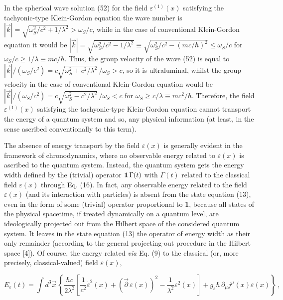 \documentclass[a4paper,12pt]{article}
\begin{document}
In the spherical wave solution (52) for the field $\varepsilon^{(1)}(x)$ satisfying the tachyonic-type Klein-Gordon equation the wave number is $|\vec{k}| = \sqrt{\omega^2_S/c^2+1/\lambda^2} > \! \omega_S/c$, while in the case of conventional Klein-Gordon equation it would be $|\vec{k}| = \sqrt{\omega^2_S/c^2 - 1/\lambda^2} \equiv \sqrt{\omega^2_S/c^2 - (mc/\hbar)^2} \leq \omega_S/c$ for $\omega_S/c \geq 1/\lambda \equiv mc/\hbar$. Thus, the group velocity of the wave (52) is equal to $|\vec{k}|/(\omega_S/c^2) = c\sqrt{\omega^2_S + c^2/\lambda^2}\,/\omega_S > c$, so it is ultraluminal, whilst the group velocity in the case of conventional Klein-Gordon equation would be $|\vec{k}|/(\omega_S/c^2) = c\sqrt{\omega^2_S - c^2/\lambda^2}\,/\omega_S < c$ for $\omega_S \geq c/\lambda \equiv mc^2/\hbar$. Therefore, the field $\varepsilon^{(1)}(x)$ satisfying the tachyonic-type Klein-Gordon equation cannot transport the energy of a quantum system and so, any physical information (at least, in the sense ascribed conventionally to this term).

\vspace{0.2cm}


\vspace{0.2cm}

The absence of energy transport by the field $\varepsilon(x)$ is generally evident in the framework of chronodynamics, where no observable energy related to $\varepsilon(x)$ is ascribed to the quantum system. Instead, the quantum system gets the energy width defined by the (trivial) operator ${\bf 1}\,\Gamma(t)$ with $\Gamma(t)$ related to the classical field $\varepsilon(x)$ through Eq. (16). In fact, any observable energy related to the field $\varepsilon(x)$ (and its interaction with particles) is absent from the state equation (13), even in the form of some (trivial) operator proportional to {\bf 1}, because all states of the physical spacetime, if treated dynamically on a quantum level, are ideologically projected out from the Hilbert space of the considered quantum system. It leaves in the state equation (13) the operator of energy width as their only remainder (according to the general projecting-out procedure in the Hilbert space [4]). Of course, the energy related {\it via} Eq. (9) to the classical (or, more precisely, classical-valued) field $\varepsilon(x)$,

\begin{equation}
 E_\varepsilon(t) =  \int d^3\vec{x}\,\left\{\frac{\hbar c}{2\lambda^2}\left[\frac{1}{c^2} \dot{\varepsilon}^2(x) + \left(\vec{\partial}\, \varepsilon(x)\right)^2 - \frac{1}{\lambda^2}{\varepsilon}^2(x) \right] + g_{\varepsilon} \hbar\, \partial_\mu j^\mu(x) \varepsilon(x) \right\}\,,
\end{equation}
\end{document}
